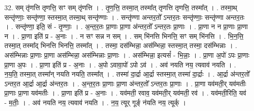 \documentclass[17pt]{extarticle}
\begin{document}
32. सम् तृ॑णत्ति तृणत्ति॒ सꣳ सम् तृ॑णत्ति । . तृ॒ण॒त्ति॒ तस्मा॒त् तस्मा᳚त् तृणत्ति तृणत्ति॒ तस्मा᳚त् । . तस्मा॒थ् सन्तृ॑ण्णाः॒ सन्तृ॑ण्णा॒ स्तस्मा॒त् तस्मा॒थ् सन्तृ॑ण्णाः । . सन्तृ॑ण्णा अन्तर॒तो᳚ ऽन्तर॒तः सन्तृ॑ण्णाः॒ सन्तृ॑ण्णा अन्तर॒तः । . सन्तृ॑ण्णा॒ इति॒ सं - तृ॒ण्णाः॒ । . अ॒न्त॒र॒तः प्रा॒णाः प्रा॒णा अ॑न्तर॒तो᳚ ऽन्तर॒तः प्रा॒णाः । . प्रा॒णा न न प्रा॒णाः प्रा॒णा न । . प्रा॒णा इति॑ प्र - अ॒नाः । . न सꣳ सन्न न सम् । . सम् भि॑नत्ति भिनत्ति॒ सꣳ सम् भि॑नत्ति । . भि॒न॒त्ति॒ तस्मा॒त् तस्मा᳚द् भिनत्ति भिनत्ति॒ तस्मा᳚त् । . तस्मा॒ दस॑म्भिन्ना॒ अस॑म्भिन्ना॒ स्तस्मा॒त् तस्मा॒ दस॑म्भिन्नाः । . अस॑म्भिन्नाः प्रा॒णाः प्रा॒णा अस॑म्भिन्ना॒ अस॑म्भिन्नाः प्रा॒णाः । . अस॑म्भिन्ना॒ इत्यसं᳚ - भि॒न्नाः॒ । . प्रा॒णा अ॒पो॑ ऽपः प्रा॒णाः प्रा॒णा अ॒पः । . प्रा॒णा इति॑ प्र - अ॒नाः । . अ॒पो ऽवावा॒पो॑ ऽपो ऽव॑ । . अव॑ नयति नय॒ त्यवाव॑ नयति । . न॒य॒ति॒ तस्मा॒त् तस्मा᳚न् नयति नयति॒ तस्मा᳚त् । . तस्मा॑ दा॒र्द्रा आ॒र्द्रा स्तस्मा॒त् तस्मा॑ दा॒र्द्राः । . आ॒र्द्रा अ॑न्तर॒तो᳚ ऽन्तर॒त आ॒र्द्रा आ॒र्द्रा अ॑न्तर॒तः । . अ॒न्त॒र॒तः प्रा॒णाः प्रा॒णा अ॑न्तर॒तो᳚ ऽन्तर॒तः प्रा॒णाः । . प्रा॒णा यव॑मती॒र् यव॑मतीः प्रा॒णाः प्रा॒णा यव॑मतीः । . प्रा॒णा इति॑ प्र - अ॒नाः । . यव॑मती॒ रवाव॒ यव॑मती॒र् यव॑मती॒ रव॑ । . यव॑मती॒रिति॒ यव॑ - म॒तीः॒ । . अव॑ नयति नय॒ त्यवाव॑ नयति । . न॒य॒ त्यूर् गूर्ङ् न॑यति नय॒ त्यूर्क् । \newline
\end{document}
